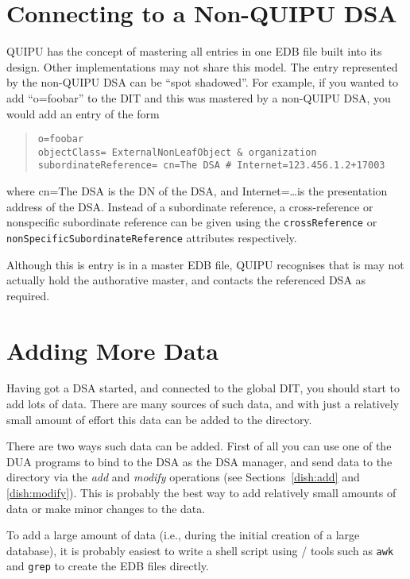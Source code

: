 \section {Connecting to a Non-QUIPU DSA}
\label{DSA:nonquipu}

QUIPU has the concept of mastering all entries in one EDB file built
into its design.  Other implementations may not share this model.
The entry represented by the non-QUIPU DSA can be 
``spot shadowed''.
For example, if you wanted to add ``o=foobar'' to the DIT and this was
mastered by a non-QUIPU DSA, you would add an entry of the form
\begin{quote}\small\begin{verbatim}
o=foobar
objectClass= ExternalNonLeafObject & organization
subordinateReference= cn=The DSA # Internet=123.456.1.2+17003
\end{verbatim}\end{quote}
where cn=The DSA is the DN of the DSA, and
Internet=\ldots is the presentation address of the DSA.
Instead of a subordinate reference, a cross-reference or  nonspecific
subordinate reference can be given using the \verb+crossReference+
or \verb+nonSpecificSubordinateReference+ attributes respectively.

Although this is entry is in a master EDB file, QUIPU recognises that
is may not actually hold the authorative master, and contacts 
the referenced DSA as required.

\section {Adding More Data}
\label{adding_data}

Having got a DSA started, and connected to the global DIT, you should start
to add lots of data.
There are many sources of such data, and with just a relatively small amount
of effort this data can be added to the directory.

There are two ways such data can be added.
First of all you can use one of the DUA programs to bind to the DSA as the
DSA manager, and send data to the directory via the {\em add} and {\em modify} 
operations (see Sections~\ref{dish:add} and \ref{dish:modify}).
This is probably the best way to add relatively small amounts of data
or make minor changes to the data.

To add a large amount of data (i.e., during the initial creation of a 
large database), it is probably easiest to write a shell script using \unix/
tools such as \verb"awk" and \verb"grep" to create the EDB files directly.

